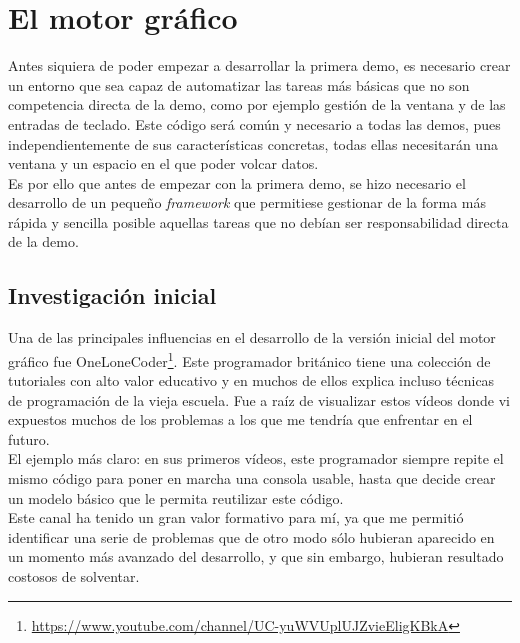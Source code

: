 
\chapter{El motor gráfico}

Antes siquiera de poder empezar a desarrollar la primera demo, es necesario crear un entorno que sea capaz de automatizar las tareas más básicas que no son competencia directa de la demo, como por ejemplo gestión de la ventana y de las entradas de teclado. Este código será común y necesario a todas las demos, pues independientemente de sus características concretas, todas ellas necesitarán una ventana y un espacio en el que poder volcar datos.\\

Es por ello que antes de empezar con la primera demo, se hizo necesario el desarrollo de un pequeño \emph{framework} que permitiese gestionar de la forma más rápida y sencilla posible aquellas tareas que no debían ser responsabilidad directa de la demo. 

\section{Investigación inicial}

Una de las principales influencias en el desarrollo de la versión inicial del motor gráfico fue OneLoneCoder\footnote{\url{https://www.youtube.com/channel/UC-yuWVUplUJZvieEligKBkA}}. Este programador británico tiene una colección de tutoriales con alto valor educativo y en muchos de ellos explica incluso técnicas de programación de la vieja escuela. Fue a raíz de visualizar estos vídeos donde vi expuestos muchos de los problemas a los que me tendría que enfrentar en el futuro.\\

El ejemplo más claro: en sus primeros vídeos, este programador siempre repite el mismo código para poner en marcha una consola usable, hasta que decide crear un modelo básico que le permita reutilizar este código.\\

Este canal ha tenido un gran valor formativo para mí, ya que me permitió identificar una serie de problemas que de otro modo sólo hubieran aparecido en un momento más avanzado del desarrollo, y que sin embargo, hubieran resultado costosos de solventar.\\

